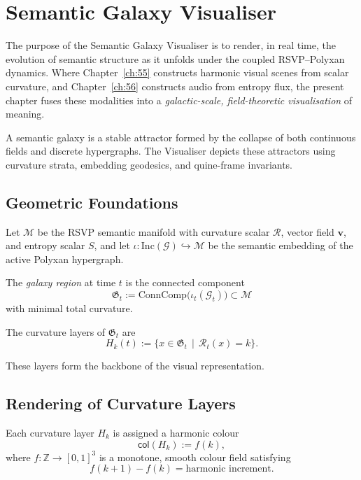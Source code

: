 \chapter{Semantic Galaxy Visualiser}
\label{ch:57}

The purpose of the Semantic Galaxy Visualiser is to render, in real time,
the evolution of semantic structure as it unfolds under the coupled
RSVP--Polyxan dynamics.  
Where Chapter~\ref{ch:55} constructs harmonic visual scenes from scalar
curvature, and Chapter~\ref{ch:56} constructs audio from entropy flux,
the present chapter fuses these modalities into a \emph{galactic-scale,
field-theoretic visualisation} of meaning.

A semantic galaxy is a stable attractor formed by the collapse of both
continuous fields and discrete hypergraphs.  
The Visualiser depicts these attractors using curvature strata, embedding
geodesics, and quine-frame invariants.

\section{Geometric Foundations}
\label{sec:57:geometry}

Let $\mathcal{M}$ be the RSVP semantic manifold with curvature scalar
$\mathcal{R}$, vector field $\mathbf{v}$, and entropy scalar $S$, and let
$\iota : \mathrm{Inc}(\mathcal{G}) \hookrightarrow \mathcal{M}$ be the
semantic embedding of the active Polyxan hypergraph.

\begin{definition}
The \emph{galaxy region} at time $t$ is the connected component
\[
\mathfrak{G}_t := \text{ConnComp}\bigl( \iota_t(\mathcal{G}_t) \bigr)
\subset \mathcal{M}
\]
with minimal total curvature.
\end{definition}

\begin{definition}
The curvature layers of $\mathfrak{G}_t$ are
\[
H_k(t) := \{ x\in\mathfrak{G}_t \,\mid\, \mathcal{R}_t(x) = k\}.
\]
\end{definition}

These layers form the backbone of the visual representation.

\section{Rendering of Curvature Layers}
\label{sec:57:rendering}

\begin{definition}
Each curvature layer $H_k$ is assigned a harmonic colour
\[
\mathsf{col}(H_k) := f(k),
\]
where $f:\mathbb{Z}\to[0,1]^3$ is a monotone, smooth colour field satisfying
\[
f(k+1) - f(k) = \text{harmonic increment}.
\]
\end{definition}

